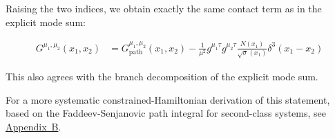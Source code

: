 Raising the two indices, we obtain exactly the same contact term as in the explicit mode sum:

\begin{align}
G^{\mu_{1},\mu_{2}}(x_{1},x_{2}) & =G_{\mathrm{path}}^{\mu_{1},\mu_{2}}(x_{1},x_{2})-\frac{1}{\mu ^{2}}g^{\mu_{1}\tau}g^{\mu_{2}\tau}\frac{N(x_{1})}{\sqrt{ \sigma }(x_{1})}\delta ^{3}(x_{1}-x_{2})
\end{align}

This also agrees with the branch decomposition of the explicit mode sum.

For a more systematic constrained-Hamiltonian derivation of this statement, based on the Faddeev-Senjanovic path integral for second-class systems, see \hyperref[app:faddeev-senjanovic]{Appendix~B}.
